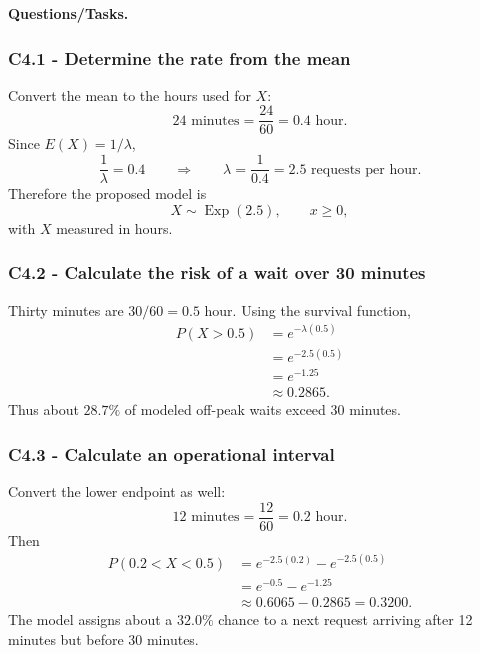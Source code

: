 \textbf{Questions/Tasks.}
\begin{enumerate}
\end{enumerate}

\subsubsection*{C4.1 - Determine the rate from the mean}\label{subsec:c4-applied-logistics-a}
Convert the mean to the hours used for $X$:
\[
 24\text{ minutes}=\frac{24}{60}=0.4\text{ hour}.
\]
Since $E(X)=1/\lambda$,
\[
 \frac1\lambda=0.4
 \qquad\Longrightarrow\qquad
 \lambda=\frac1{0.4}=2.5\text{ requests per hour}.
\]
Therefore the proposed model is
\[
 X\sim\operatorname{Exp}(2.5),\qquad x\geq0,
\]
with $X$ measured in hours.

\subsubsection*{C4.2 - Calculate the risk of a wait over 30 minutes}\label{subsec:c4-applied-logistics-b}
Thirty minutes are $30/60=0.5$ hour.  Using the survival function,
\[
\begin{aligned}
 P(X>0.5)
 &=e^{-\lambda(0.5)}\\
 &=e^{-2.5(0.5)}\\
 &=e^{-1.25}\\
 &\approx0.2865.
\end{aligned}
\]
Thus about $28.7\%$ of modeled off-peak waits exceed 30 minutes.

\subsubsection*{C4.3 - Calculate an operational interval}\label{subsec:c4-applied-logistics-c}
Convert the lower endpoint as well:
\[
 12\text{ minutes}=\frac{12}{60}=0.2\text{ hour}.
\]
Then
\[
\begin{aligned}
 P(0.2<X<0.5)
 &=e^{-2.5(0.2)}-e^{-2.5(0.5)}\\
 &=e^{-0.5}-e^{-1.25}\\
 &\approx0.6065-0.2865=0.3200.
\end{aligned}
\]
The model assigns about a $32.0\%$ chance to a next request arriving after
12 minutes but before 30 minutes.

